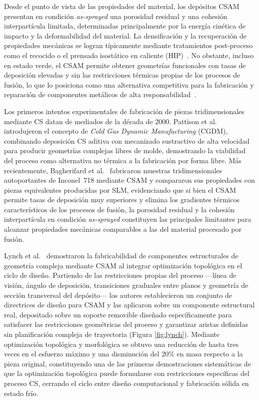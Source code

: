 Desde el punto de vista de las propiedades del material, los depósitos CSAM
presentan en condición \textit{as-sprayed} una porosidad residual y una
cohesión interpartícula limitada, determinadas principalmente por la energía
cinética de impacto y la deformabilidad del material. La densificación y la
recuperación de propiedades mecánicas se logran típicamente mediante tratamientos
post-proceso como el recocido o el prensado isostático en caliente
(HIP)~\cite{Kondas2024feedstock}. No obstante, incluso en estado verde, el CSAM permite obtener geometrías funcionales con tasas
de deposición elevadas y sin las restricciones térmicas propias de los procesos
de fusión, lo que lo posiciona como una alternativa competitiva para la
fabricación y reparación de componentes metálicos de alta
responsabilidad~\cite{Champagne2015repairs}.

Los primeros intentos experimentales de fabricación de piezas tridimensionales
mediante CS datan de mediados de la década de 2000. Pattison
et al.~\cite{Pattison2007CGDM} introdujeron el concepto de \textit{Cold Gas Dynamic
	Manufacturing} (CGDM), combinando deposición CS aditiva con mecanizado
sustractivo de alta velocidad para producir geometrías complejas libres de
molde, demostrando la viabilidad del proceso como alternativa no térmica a la
fabricación por forma libre. Más recientemente, Bagherifard
et al.~\cite{Bagherifard2018freeform} fabricaron muestras tridimensionales
autoportantes de Inconel~718 mediante CSAM y compararon sus propiedades con
piezas equivalentes producidas por SLM, evidenciando que si bien el CSAM
permite tasas de deposición muy superiores y elimina los gradientes térmicos
característicos de los procesos de fusión, la porosidad residual y la cohesión
interpartícula en condición \textit{as-sprayed} constituyen las principales
limitantes para alcanzar propiedades mecánicas comparables a las del material
procesado por fusión. 

Lynch et al.~\cite{Lynch2013topology} demostraron la fabricabilidad de 
componentes estructurales de geometría compleja mediante CSAM al integrar 
optimización topológica en el ciclo de diseño. Partiendo de las restricciones 
propias del proceso —línea de visión, ángulo de deposición, transiciones 
graduales entre planos y geometría de sección transversal del depósito— los 
autores establecieron un conjunto de directrices de diseño para CSAM y las 
aplicaron sobre un componente estructural real, depositado sobre un soporte 
removible diseñado específicamente para satisfacer las restricciones 
geométricas del proceso y garantizar aristas definidas sin planificación 
compleja de trayectoria (Figura \ref{fig:lynch}). Mediante optimización topológica y morfológica se 
obtuvo una reducción de hasta tres veces en el esfuerzo máximo y una 
disminución del 20$\%$ en masa respecto a la pieza original, constituyendo 
una de las primeras demostraciones sistemáticas de que la optimización topológica puede 
formularse con restricciones específicas del proceso CS, cerrando el ciclo 
entre diseño computacional y fabricación sólida en estado frío.

